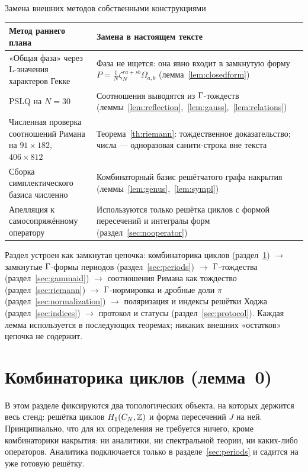 \begin{keybox}{Замена внешних методов собственными конструкциями}
\begin{center}
\small
\begin{tabularx}{\textwidth}{@{}>{\raggedright\arraybackslash}p{} >{\raggedright\arraybackslash}X@{}}
\toprule
\textbf{Метод раннего плана} & \textbf{Замена в настоящем тексте} \\
\midrule
«Общая фаза» через L-значения характеров Гекке &
Фаза не ищется: она явно входит в замкнутую форму
$P=\tfrac1N\zeta_N^{ra+sb}\Omega_{a,b}$ (лемма~\ref{lem:closedform}) \\
PSLQ на $N=30$ &
Соотношения выводятся из $\Gamma$-тождеств
(леммы~\ref{lem:reflection},~\ref{lem:gauss},~\ref{lem:relations}) \\
Численная проверка соотношений Римана на $91\times182$, $406\times812$ &
Теорема~\ref{th:riemann}: тождественное доказательство; числа ---
одноразовая санити-строка вне текста \\
Сборка симплектического базиса численно &
Комбинаторный базис решётчатого графа накрытия
(леммы~\ref{lem:genus},~\ref{lem:sympl}) \\
Апелляция к самосопряжённому оператору &
Используются только решётка циклов с формой пересечений и интегралы
форм (раздел~\ref{sec:nooperator}) \\
\bottomrule
\end{tabularx}
\end{center}
\end{keybox}

Раздел устроен как замкнутая цепочка: комбинаторика циклов
(раздел~\ref{sec:cycles}) $\to$ замкнутые $\Gamma$-формы периодов
(раздел~\ref{sec:periods}) $\to$ $\Gamma$-тождества
(раздел~\ref{sec:gammaid}) $\to$ соотношения Римана как тождество
(раздел~\ref{sec:riemann}) $\to$ $\Gamma$-нормировка и дробные доли
$\pi$ (раздел~\ref{sec:normalization}) $\to$ поляризация и индексы
решётки Ходжа (раздел~\ref{sec:indices}) $\to$ протокол и статусы
(раздел~\ref{sec:protocol}). Каждая лемма используется в последующих
теоремах; никаких внешних «остатков» цепочка не содержит.

\section{Комбинаторика циклов (лемма~0)}\label{sec:cycles}

В этом разделе фиксируются два топологических объекта, на которых
держится весь стенд: решётка циклов $H_1(C_N,\mathbb{Z})$ и форма пересечений
$J$ на ней. Принципиально, что для их определения не требуется ничего,
кроме комбинаторики накрытия: ни аналитики, ни спектральной теории,
ни каких-либо операторов. Аналитика подключается только в
разделе~\ref{sec:periods} и садится на уже готовую решётку.

